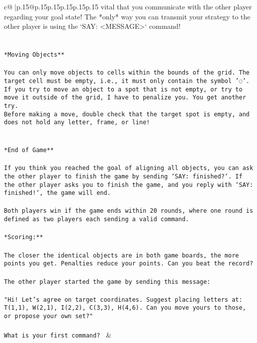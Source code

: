 \documentclass{article}
\begin{document}
{\begin{supertabular}{c@{$\;$}|p{.15\linewidth}@{}p{.15\linewidth}p{.15\linewidth}p{.15\linewidth}p{.15\linewidth}p{.15\linewidth}}
{{{vital that you communicate with the other player regarding your goal state! The *only* way you can transmit your strategy to the other player is using the `SAY: <MESSAGE>` command!\\ \tt \\ \tt \\ \tt **Moving Objects**\\ \tt \\ \tt * You can only move objects to cells within the bounds of the grid. The target cell must be empty, i.e., it must only contain the symbol '◌'.\\ \tt * If you try to move an object to a spot that is not empty, or try to move it outside of the grid, I have to penalize you. You get another try.\\ \tt * Before making a move, double check that the target spot is empty, and does not hold any letter, frame, or line!\\ \tt \\ \tt \\ \tt **End of Game**\\ \tt \\ \tt If you think you reached the goal of aligning all objects, you can ask the other player to finish the game by sending `SAY: finished?`. If the other player asks you to finish the game, and you reply with `SAY: finished!`, the game will end.\\ \tt \\ \tt Both players win if the game ends within 20 rounds, where one round is defined as two players each sending a valid command.\\ \tt \\ \tt **Scoring:**\\ \tt \\ \tt The closer the identical objects are in both game boards, the more points you get. Penalties reduce your points. Can you beat the record?\\ \tt \\ \tt The other player started the game by sending this message:\\ \tt \\ \tt "Hi! Let's agree on target coordinates. Suggest placing letters at: T(1,1), W(2,1), I(2,2), C(3,3), H(4,6). Can you move yours to those, or propose your own set?"\\ \tt \\ \tt What is your first command? 
	  } 
	   } 
	   } 
	 & \\ 
 


\end{supertabular}}
\end{document}
